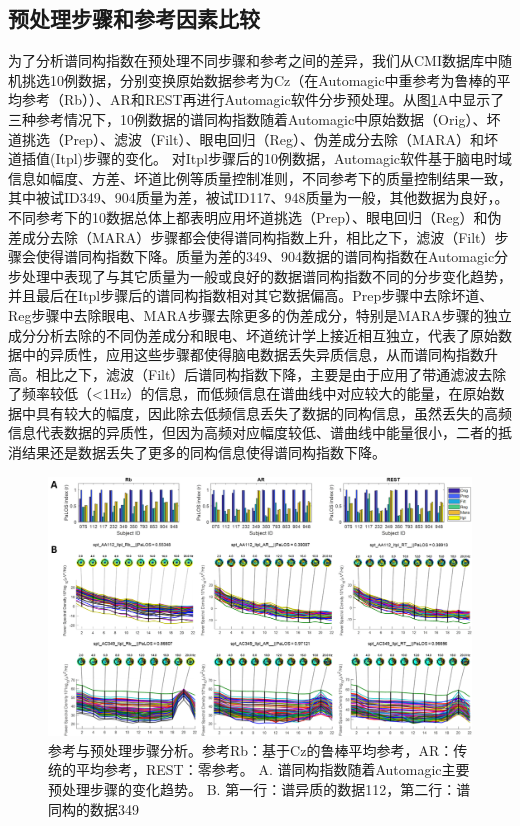 \subsection{预处理步骤和参考因素比较}
为了分析谱同构指数在预处理不同步骤和参考之间的差异，我们从CMI数据库中随机挑选10例数据，分别变换原始数据参考为Cz（在Automagic中重参考为鲁棒的平均参考（Rb））、AR和REST再进行Automagic软件分步预处理。从图\ref{fig5}A中显示了三种参考情况下，10例数据的谱同构指数随着Automagic中原始数据（Orig）、坏道挑选（Prep）、滤波（Filt）、眼电回归（Reg）、伪差成分去除（MARA）和坏道插值(Itpl)步骤的变化。 对Itpl步骤后的10例数据，Automagic软件基于脑电时域信息如幅度、方差、坏道比例等质量控制准则，不同参考下的质量控制结果一致，其中被试ID349、904质量为差，被试ID117、948质量为一般，其他数据为良好，。不同参考下的10数据总体上都表明应用坏道挑选（Prep）、眼电回归（Reg）和伪差成分去除（MARA）步骤都会使得谱同构指数上升，相比之下，滤波（Filt）步骤会使得谱同构指数下降。质量为差的349、904数据的谱同构指数在Automagic分步处理中表现了与其它质量为一般或良好的数据谱同构指数不同的分步变化趋势，并且最后在Itpl步骤后的谱同构指数相对其它数据偏高。Prep步骤中去除坏道、Reg步骤中去除眼电、MARA步骤去除更多的伪差成分，特别是MARA步骤的独立成分分析去除的不同伪差成分和眼电、坏道统计学上接近相互独立，代表了原始数据中的异质性，应用这些步骤都使得脑电数据丢失异质信息，从而谱同构指数升高。相比之下，滤波（Filt）后谱同构指数下降，主要是由于应用了带通滤波去除了频率较低（<1Hz）的信息，而低频信息在谱曲线中对应较大的能量，在原始数据中具有较大的幅度，因此除去低频信息丢失了数据的同构信息，虽然丢失的高频信息代表数据的异质性，但因为高频对应幅度较低、谱曲线中能量很小，二者的抵消结果还是数据丢失了更多的同构信息使得谱同构指数下降。
\begin{figure}[!ht]
	\includegraphics[width=15cm]{pic/palos/step.png}
	\caption{参考与预处理步骤分析。参考Rb：基于Cz的鲁棒平均参考，AR：传统的平均参考，REST：零参考。 A. 谱同构指数随着Automagic主要预处理步骤的变化趋势。 B. 第一行：谱异质的数据112，第二行：谱同构的数据349}
	\label{fig5}
\end{figure}
